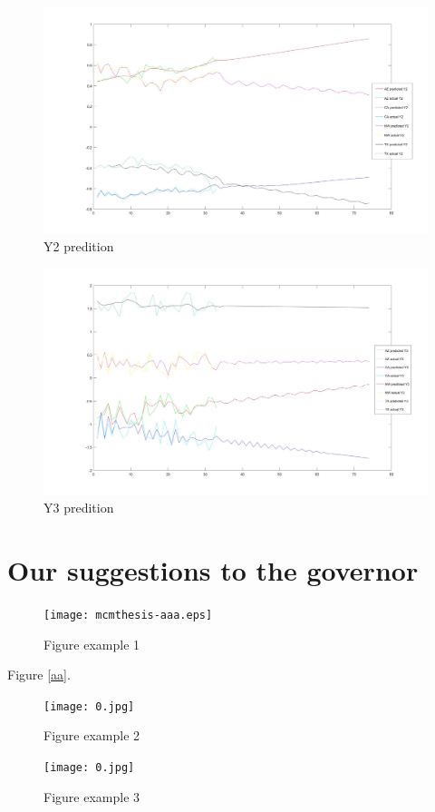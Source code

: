 \documentclass{mcmthesis}
\begin{document}
\begin{enumerate}
        \begin{figure}[!hbpt]
          \centering
          \includegraphics[width=450px]{Y2.jpg}
          \caption{Y2 predition}\label{1}
        \end{figure}

        \begin{figure}[!hbpt]
          \centering
          \includegraphics[width=450px]{Y3.jpg}
          \caption{Y3 predition}\label{2}
        \end{figure}


\section{Our suggestions to the governor}
\begin{figure}[h]
\centering
\texttt{[image: mcmthesis-aaa.eps]}
\caption{Figure example 1} \label{fig:aa}
\end{figure}


Figure \ref{aa}.

\begin{figure}[h]
\begin{minipage}[h]{0.5\linewidth}
\centering
\texttt{[image: 0.jpg]}
\caption{Figure example 2}
\end{minipage}
\begin{minipage}[h]{0.5\linewidth}
\centering
\texttt{[image: 0.jpg]}
\caption{Figure example 3}
\end{minipage}
\end{figure}




\end{enumerate}
\end{document}
